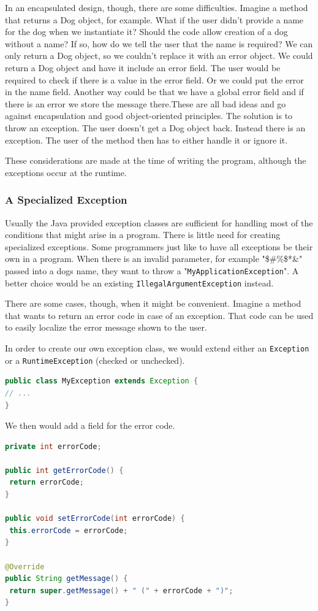 In an encapsulated design, though, there are some difficulties. Imagine a method that returns a Dog object, for example. What if the user didn't provide a name for the dog when we instantiate it? Should the code allow creation of a dog without a name? If so, how do we tell the user that the name is required? We can only return a Dog object, so we couldn't replace it with an error object. We could return a Dog object and have it include an error field. The user would be required to check if there is a value in the error field. Or we could put the error in the name field. Another way could be that we have a global error field and if there is an error we store the message there.These are all bad ideas and go against encapsulation and good object-oriented principles. The solution is to throw an exception. The user doesn't get a Dog object back. Instead there is an exception. The user of the method then has to either handle it or ignore it.

These considerations are made at the time of writing the program, although the exceptions occur at the runtime.

\subsubsection{A Specialized Exception}
Usually the Java provided exception classes are sufficient for handling most of the conditions that might arise in a program. There is little need for creating specialized exceptions. Some programmers just like to have all exceptions be their own in a program. When there is an invalid parameter, for example "\@\$\#\%\$*\&" passed into a dogs name, they want to  throw a "\texttt{MyApplicationException}". A better choice would be an existing  \texttt{IllegalArgumentException} instead.

There are some cases, though, when it might be convenient. Imagine a method that wants to return an error code in case of an exception. That code can be used to easily localize the error message shown to the user. 

In order to create our own exception class, we would extend either an \texttt{Exception} or a \texttt{RuntimeException} (checked or unchecked).
\begin{lstlisting}[language=Java]
public class MyException extends Exception {
// ...
}
\end{lstlisting}

We then would add a field for the error code. 
\begin{lstlisting}[language=Java]
private int errorCode;

public int getErrorCode() {
 return errorCode;
}

public void setErrorCode(int errorCode) {
 this.errorCode = errorCode;
}

@Override
public String getMessage() {
 return super.getMessage() + " (" + errorCode + ")";
}
\end{lstlisting}


